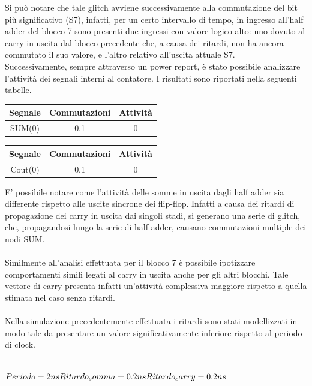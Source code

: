 \documentclass[10pt,  english, makeidx, a4paper, titlepage, oneside]{book}
\begin{document}
Si può notare che tale glitch avviene successivamente alla commutazione
del bit più significativo (S7), infatti, per un certo intervallo di tempo,
in ingresso all'half adder del blocco 7 sono presenti due ingressi con valore
logico alto: uno dovuto al carry in uscita dal blocco precedente che, a causa
dei ritardi, non ha ancora commutato il suo valore, e l'altro relativo all'uscita
attuale S7.
\\
Successivamente, sempre attraverso un power report, è stato possibile
analizzare l'attività dei segnali interni al contatore. I risultati sono 
riportati nella seguenti tabelle.
\\
\begin{center}
	\begin{tabular}{|c|c|c|}
	\hline
	Segnale & Commutazioni & Attività \\ 
	\hline
	SUM(0) & 0.1 & 0 \\
	\hline
	\end{tabular}	
	\begin{tabular}{|c|c|c|}
	\hline
	Segnale & Commutazioni & Attività \\ 
	\hline
	Cout(0) & 0.1 & 0 \\
	\hline
	\end{tabular}
\end{center}
\vspace{0.3cm}
E' possibile notare come l'attività delle somme in uscita dagli
half adder sia differente rispetto alle uscite sincrone dei flip-flop.
Infatti a causa dei ritardi di propagazione dei carry in uscita dai 
singoli stadi, si generano una serie di glitch, che, propagandosi lungo
la serie di half adder, causano commutazioni multiple dei nodi SUM.
\\\\
Similmente all'analisi effettuata per il blocco 7 è possibile ipotizzare
comportamenti simili legati al carry in uscita anche per gli altri blocchi.
Tale vettore di carry presenta infatti un'attività complessiva maggiore 
rispetto a quella stimata nel caso senza ritardi.
\\\\
Nella simulazione precedentemente effettuata i ritardi sono stati
modellizzati in modo tale da presentare un valore significativamente
inferiore rispetto al periodo di clock.
\\\\
\centerline{$Periodo = 2ns \\
            Ritardo_somma = 0.2ns \\
            Ritardo_carry = 0.2ns $}
\end{document}
